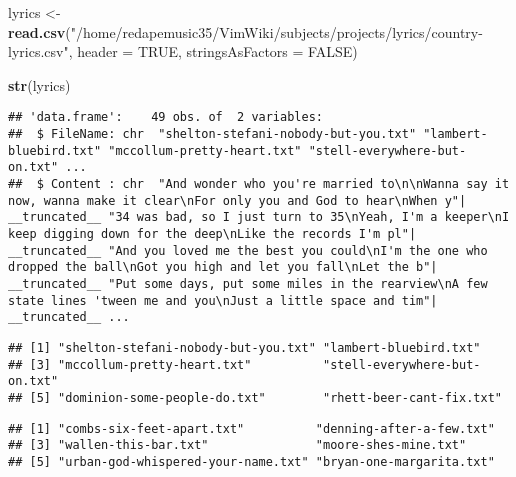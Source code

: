 \documentclass[]{article}
\newenvironment{Shaded}{\begin{snugshade}}{\end{snugshade}}
\newcommand{\DataTypeTok}[1]{\textcolor[rgb]{0.13,0.29,0.53}{#1}}
\newcommand{\KeywordTok}[1]{\textcolor[rgb]{0.13,0.29,0.53}{\textbf{#1}}}
\newcommand{\NormalTok}[1]{#1}
\newcommand{\OperatorTok}[1]{\textcolor[rgb]{0.81,0.36,0.00}{\textbf{#1}}}
\newcommand{\OtherTok}[1]{\textcolor[rgb]{0.56,0.35,0.01}{#1}}
\newcommand{\StringTok}[1]{\textcolor[rgb]{0.31,0.60,0.02}{#1}}
\begin{document}
\begin{Shaded}
\begin{Highlighting}[]
\NormalTok{lyrics <-}\StringTok{ }\KeywordTok{read.csv}\NormalTok{(}\StringTok{"/home/redapemusic35/VimWiki/subjects/projects/lyrics/country-lyrics.csv"}\NormalTok{, }\DataTypeTok{header =} \OtherTok{TRUE}\NormalTok{, }\DataTypeTok{stringsAsFactors =} \OtherTok{FALSE}\NormalTok{)}

\KeywordTok{str}\NormalTok{(lyrics)}
\end{Highlighting}
\end{Shaded}

\begin{verbatim}
## 'data.frame':    49 obs. of  2 variables:
##  $ FileName: chr  "shelton-stefani-nobody-but-you.txt" "lambert-bluebird.txt" "mccollum-pretty-heart.txt" "stell-everywhere-but-on.txt" ...
##  $ Content : chr  "And wonder who you're married to\n\nWanna say it now, wanna make it clear\nFor only you and God to hear\nWhen y"| __truncated__ "34 was bad, so I just turn to 35\nYeah, I'm a keeper\nI keep digging down for the deep\nLike the records I'm pl"| __truncated__ "And you loved me the best you could\nI'm the one who dropped the ball\nGot you high and let you fall\nLet the b"| __truncated__ "Put some days, put some miles in the rearview\nA few state lines 'tween me and you\nJust a little space and tim"| __truncated__ ...
\end{verbatim}

\begin{Shaded}
\end{Shaded}

\begin{verbatim}
## [1] "shelton-stefani-nobody-but-you.txt" "lambert-bluebird.txt"              
## [3] "mccollum-pretty-heart.txt"          "stell-everywhere-but-on.txt"       
## [5] "dominion-some-people-do.txt"        "rhett-beer-cant-fix.txt"
\end{verbatim}

\begin{Shaded}
\end{Shaded}

\begin{verbatim}
## [1] "combs-six-feet-apart.txt"          "denning-after-a-few.txt"          
## [3] "wallen-this-bar.txt"               "moore-shes-mine.txt"              
## [5] "urban-god-whispered-your-name.txt" "bryan-one-margarita.txt"
\end{verbatim}
\end{document}
